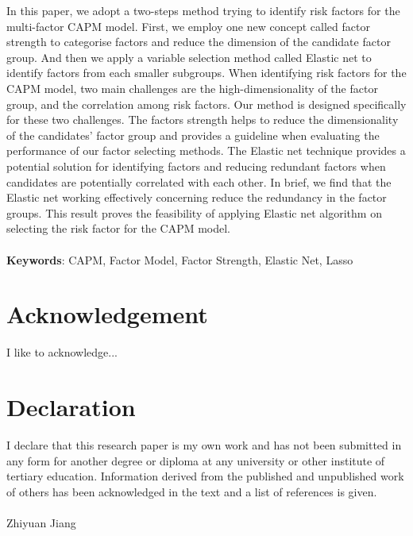 In this paper, we adopt a two-steps method trying to identify risk factors for the multi-factor CAPM model.
First, we employ one new concept called factor strength to categorise factors and reduce the dimension of the candidate factor group.
And then we apply a variable selection method called Elastic net to identify factors from each smaller subgroups.
When identifying risk factors for the CAPM model, two main challenges are the high-dimensionality of the factor group, and the correlation among risk factors.
Our method is designed specifically for these two challenges. 
The factors strength helps to reduce the dimensionality of the candidates' factor group and provides a guideline when evaluating the performance of our factor selecting methods.
The Elastic net technique provides a potential solution for identifying factors and reducing redundant factors when candidates are potentially correlated with each other.
In brief, we find that the Elastic net working effectively concerning reduce the redundancy in the factor groups.
This result proves the feasibility of applying Elastic net algorithm on selecting the risk factor for the CAPM model.  \\
\vspace{0.5cm}\\
 \textbf{Keywords}: CAPM, Factor Model, Factor Strength, Elastic Net, Lasso


\chapter*{Acknowledgement}
I like to acknowledge...

\chapter*{Declaration}
I declare that this research paper is my own work and has not been submitted in any form for another degree or diploma at any university or other institute of tertiary education. Information derived from the published and unpublished work of others has been acknowledged in the text and a list of references is given.\\
\vspace{0.7cm}\\
Zhiyuan Jiang

